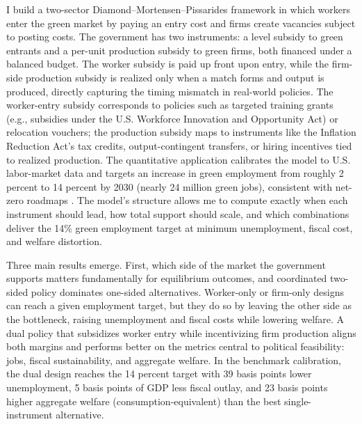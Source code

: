 \documentclass[preprint,12pt]{elsarticle}
\begin{document}
I build a two-sector Diamond–Mortensen–Pissarides framework in which workers enter the green market by paying an entry cost and firms create vacancies subject to posting costs. The government has two instruments: a level subsidy to green entrants and a per-unit production subsidy to green firms, both financed under a balanced budget. The worker subsidy is paid up front upon entry, while the firm-side production subsidy is realized only when a match forms and output is produced, directly capturing the timing mismatch in real-world policies. The worker-entry subsidy corresponds to policies such as targeted training grants (e.g., subsidies under the U.S. Workforce Innovation and Opportunity Act) or relocation vouchers; the production subsidy maps to instruments like the Inflation Reduction Act's tax credits, output-contingent transfers, or hiring incentives tied to realized production. The quantitative application calibrates the model to U.S. labor-market data and targets an increase in green employment from roughly 2 percent to 14 percent by 2030 (nearly 24 million green jobs), consistent with net-zero roadmaps \citep{workingnation2024greenjobs}. The model's structure allows me to compute exactly when each instrument should lead, how total support should scale, and which combinations deliver the 14\% green employment target at minimum unemployment, fiscal cost, and welfare distortion.

Three main results emerge. First, which side of the market the government supports matters fundamentally for equilibrium outcomes, and coordinated two-sided policy dominates one-sided alternatives. Worker-only or firm-only designs can reach a given employment target, but they do so by leaving the other side as the bottleneck, raising unemployment and fiscal costs while lowering welfare. A dual policy that subsidizes worker entry while incentivizing firm production aligns both margins and performs better on the metrics central to political feasibility: jobs, fiscal sustainability, and aggregate welfare. In the benchmark calibration, the dual design reaches the 14 percent target with 39 basis points lower unemployment, 5 basis points of GDP less fiscal outlay, and 23 basis points higher aggregate welfare (consumption-equivalent) than the best single-instrument alternative.
\end{document}
